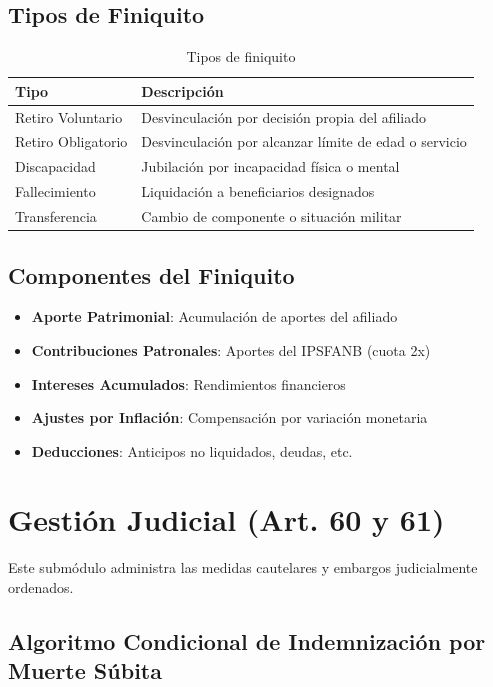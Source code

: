 \subsection*{Tipos de Finiquito}

\begin{longtable}{p{3cm}p{9cm}}
\toprule
\textbf{Tipo} & \textbf{Descripción} \\
\midrule
\endhead
\bottomrule
\caption{Tipos de finiquito}
\label{tab:tipos-finiquito}
\endlastfoot

Retiro Voluntario & Desvinculación por decisión propia del afiliado \\
Retiro Obligatorio & Desvinculación por alcanzar límite de edad o servicio \\
Discapacidad & Jubilación por incapacidad física o mental \\
Fallecimiento & Liquidación a beneficiarios designados \\
Transferencia & Cambio de componente o situación militar \\
\end{longtable}

\subsection*{Componentes del Finiquito}

\begin{itemize}[leftmargin=*]
    \item \textbf{Aporte Patrimonial}: Acumulación de aportes del afiliado
    \item \textbf{Contribuciones Patronales}: Aportes del IPSFANB (cuota 2x)
    \item \textbf{Intereses Acumulados}: Rendimientos financieros
    \item \textbf{Ajustes por Inflación}: Compensación por variación monetaria
    \item \textbf{Deducciones}: Anticipos no liquidados, deudas, etc.
\end{itemize}

\section{Gestión Judicial (Art. 60 y 61)}

Este submódulo administra las medidas cautelares y embargos judicialmente ordenados.

\subsection*{Algoritmo Condicional de Indemnización por Muerte Súbita}

